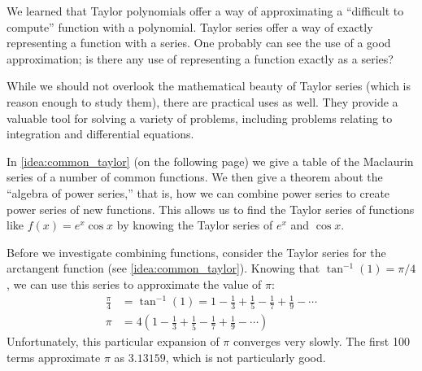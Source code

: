 We learned that Taylor polynomials offer a way of approximating a ``difficult to compute'' function with a polynomial. Taylor series offer a way of exactly representing a function with a series. One probably can see the use of a good approximation; is there any use of representing a function exactly as a series?

While we should not overlook the mathematical beauty of Taylor series (which is reason enough to study them), there are practical uses as well. They provide a valuable tool for solving a variety of problems, including problems relating to integration and differential equations.

In \autoref{idea:common_taylor} (on the following page) we give  a table of the Maclaurin series of a number of common functions. We then give a theorem about the ``algebra of power series,'' that is, how we can combine power series to create power series of new functions. This allows us to find the Taylor series of functions like $f(x) = e^x\cos x$ by knowing the Taylor series of $e^x$ and $\cos x$.

Before we investigate combining functions, consider the Taylor series for the arctangent function (see \autoref{idea:common_taylor}). Knowing that $\tan^{-1}(1) = \pi/4$, we can use this series to approximate the value of $\pi$:
\begin{align*}
\frac{\pi}4 &= \tan^{-1}(1) = 1-\frac13+\frac15-\frac17+\frac19-\dotsb\\
\pi &= 4\left(1-\frac13+\frac15-\frac17+\frac19-\dotsb\right)
\end{align*} 
Unfortunately, this particular expansion of $\pi$ converges very slowly. The first 
100 terms approximate $\pi$ as $3.13159$, which is not particularly good.

